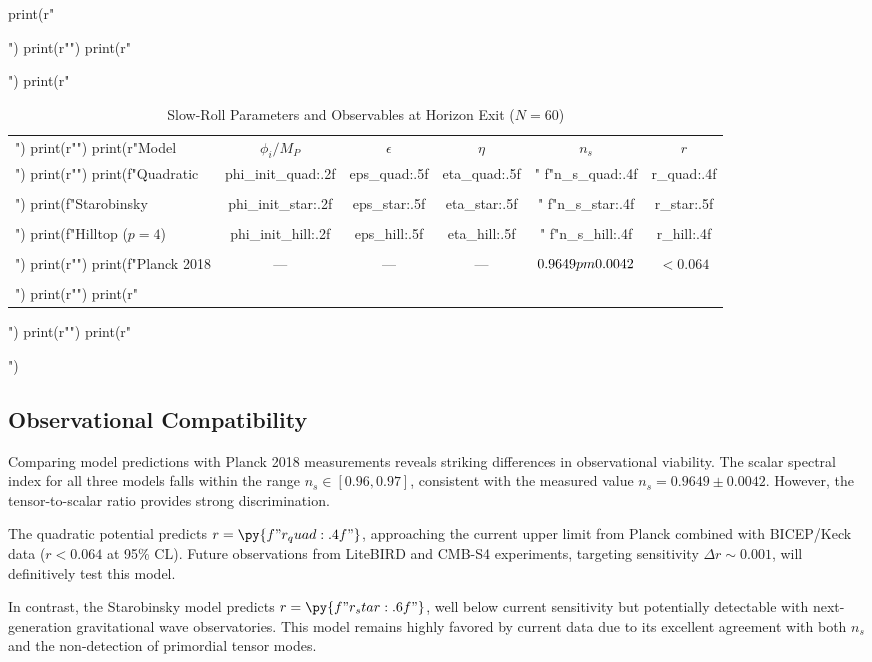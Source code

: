 \documentclass[a4paper, 11pt]{article}
\begin{document}
\begin{pycode}
print(r"\begin{table}[htbp]")
print(r"\centering")
print(r"\caption{Slow-Roll Parameters and Observables at Horizon Exit ($N=60$)}")
print(r"\begin{tabular}{lccccc}")
print(r"\toprule")
print(r"Model & $\phi_i/M_P$ & $\epsilon$ & $\eta$ & $n_s$ & $r$ \\")
print(r"\midrule")
print(f"Quadratic & {phi_init_quad:.2f} & {eps_quad:.5f} & {eta_quad:.5f} & "
      f"{n_s_quad:.4f} & {r_quad:.4f} \\\\")
print(f"Starobinsky & {phi_init_star:.2f} & {eps_star:.5f} & {eta_star:.5f} & "
      f"{n_s_star:.4f} & {r_star:.5f} \\\\")
print(f"Hilltop ($p=4$) & {phi_init_hill:.2f} & {eps_hill:.5f} & {eta_hill:.5f} & "
      f"{n_s_hill:.4f} & {r_hill:.4f} \\\\")
print(r"\midrule")
print(f"Planck 2018 & --- & --- & --- & $0.9649 \\pm 0.0042$ & $< 0.064$ \\\\")
print(r"\bottomrule")
print(r"\end{tabular}")
print(r"\label{tab:observables}")
print(r"\end{table}")
\end{pycode}

\subsection{Observational Compatibility}

Comparing model predictions with Planck 2018 measurements reveals striking differences in
observational viability. The scalar spectral index for all three models falls within the
range $n_s \in [0.96, 0.97]$, consistent with the measured value $n_s = 0.9649 \pm 0.0042$.
However, the tensor-to-scalar ratio provides strong discrimination.

The quadratic potential predicts $r = \py{f"{r_quad:.4f}"}$, approaching the current upper
limit from Planck combined with BICEP/Keck data ($r < 0.064$ at 95\% CL). Future observations
from LiteBIRD and CMB-S4 experiments, targeting sensitivity $\Delta r \sim 0.001$, will
definitively test this model.

In contrast, the Starobinsky model predicts $r = \py{f"{r_star:.6f}"}$, well below current
sensitivity but potentially detectable with next-generation gravitational wave observatories.
This model remains highly favored by current data due to its excellent agreement with both
$n_s$ and the non-detection of primordial tensor modes.
\end{document}
